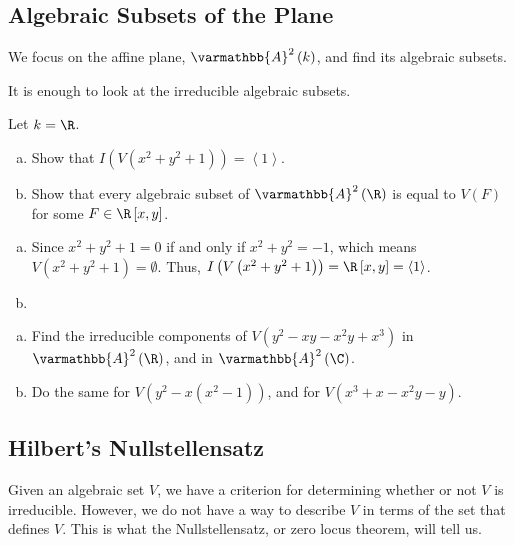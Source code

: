 \documentclass[10pt]{mypackage}
\renewcommand*{\mathbb}[1]{\varmathbb{#1}}
\newcommand{\A}{\mathbb{A}}
\begin{document}
\subsection{Algebraic Subsets of the Plane}%
We focus on the affine plane, $\A^2\left( k \right)$, and find its algebraic subsets.\newline

It is enough to look at the irreducible algebraic subsets.
\begin{exercise}[Exercise 1.30]
Let $k = \R$. 
\begin{enumerate}[(a)]
  \item Show that $I\left(V\left(x^2 + y^2 + 1\right)\right) = \left\langle 1 \right\rangle$.
  \item Show that every algebraic subset of $\A^2\left(\R\right)$ is equal to $V(F)$ for some $F\in \R\left[x,y\right]$.
\end{enumerate}
\end{exercise}
\begin{solution}\hfill
  \begin{enumerate}[(a)]
    \item Since $x^2 + y^2 + 1 = 0$ if and only if $x^2 + y^2 = -1$, which means $V\left(x^2 + y^2 + 1\right) = \emptyset$. Thus, $I\left( V\left( x^2 + y^2 + 1 \right) \right) = \R\left[ x,y \right] = \left\langle 1 \right\rangle$.
    \item 
  \end{enumerate}
\end{solution}

\begin{exercise}[Exercise 1.31]\hfill
  \begin{enumerate}[(a)]
    \item Find the irreducible components of $V\left( y^2 - xy - x^2y + x^3 \right)$ in $\A^2\left( \R \right)$, and in $\A^2\left( \C \right)$.
    \item Do the same for $V\left( y^2 - x\left( x^2 - 1 \right) \right)$, and for $V\left( x^3 + x - x^2 y - y \right)$.
  \end{enumerate}
\end{exercise}
\subsection{Hilbert's Nullstellensatz}%
Given an algebraic set $V$, we have a criterion for determining whether or not $V$ is irreducible. However, we do not have a way to describe $V$ in terms of the set that defines $V$. This is what the Nullstellensatz, or zero locus theorem, will tell us.\newline
\end{document}
